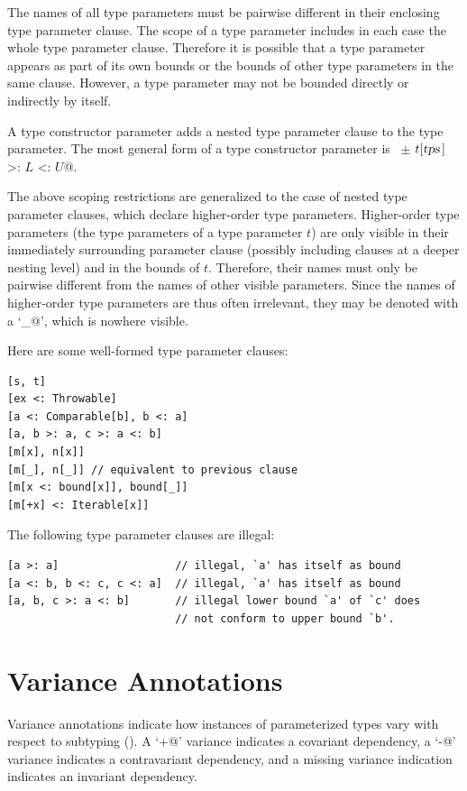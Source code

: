 The names of all type parameters must be pairwise different in their enclosing type parameter clause.  The scope of a type parameter includes in each case the whole type parameter clause. Therefore it is possible that a type parameter appears as part of its own bounds or the bounds of other type parameters in the same clause.  However, a type parameter may not be bounded directly or indirectly by itself.\

A type constructor parameter adds a nested type parameter clause to the type parameter. The most general form of a type constructor parameter is ~\lstinline@$\pm$ $t[\mbox{\sl tps}\,]$ >: $L$ <: $U$@.  

The above scoping restrictions are generalized to the case of nested type parameter clauses, which declare higher-order type parameters. Higher-order type parameters (the type parameters of a type parameter $t$) are only visible in their immediately surrounding parameter clause (possibly including clauses at a deeper nesting level) and in the bounds of $t$. Therefore, their names must only be pairwise different from the names of other visible parameters. Since the names of higher-order type parameters are thus often irrelevant, they may be denoted with a `\lstinline@_@', which is nowhere visible.

\example Here are some well-formed type parameter clauses:
\begin{lstlisting}
[s, t]
[ex <: Throwable]
[a <: Comparable[b], b <: a]
[a, b >: a, c >: a <: b]
[m[x], n[x]] 
[m[_], n[_]] // equivalent to previous clause
[m[x <: bound[x]], bound[_]]
[m[+x] <: Iterable[x]]
\end{lstlisting}
The following type parameter clauses are illegal:
\begin{lstlisting}
[a >: a]                  // illegal, `a' has itself as bound
[a <: b, b <: c, c <: a]  // illegal, `a' has itself as bound
[a, b, c >: a <: b]       // illegal lower bound `a' of `c' does
                          // not conform to upper bound `b'.
\end{lstlisting}

\section{Variance Annotations}\label{sec:variances}

Variance annotations indicate how instances of parameterized types
vary with respect to subtyping ().  A
`\lstinline@+@' variance indicates a covariant dependency, a
`\lstinline@-@' variance indicates a contravariant dependency, and a
missing variance indication indicates an invariant dependency.

